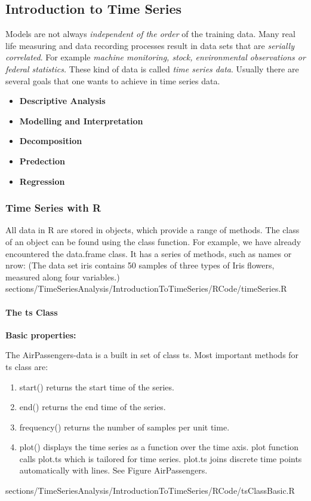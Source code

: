 \subsection{Introduction to Time Series}
	Models are not always \textit{independent of the order} of the training data. Many real life measuring and data recording processes result in data sets that are \textit{serially correlated}. For example \textit{machine monitoring, stock, environmental observations or federal statistics.} These kind of data is called \textit{time series data}. Usually there are several goals that one wants to achieve in time series data.
	\begin{itemize}
		\item \textbf{Descriptive Analysis}
		\item \textbf{Modelling and Interpretation}
		\item \textbf{Decomposition}
		\item \textbf{Predection}
		\item \textbf{Regression}
	\end{itemize}
	\subsubsection{Time Series with \color{blue}R}
		\RTheory
		{	
			All data in {\color{blue}R} are stored in objects, which provide a range of methods. The class of an object can be found using the {\color{blue}class} function. For example, we have already encountered the {\color{blue}data.frame} class. It has a series of methods, such as {\color{blue}names} or {\color{blue}nrow}: \vfill (The data set iris contains 50 samples of three types of Iris flowers, measured along four variables.)
		}
		{
			sections/TimeSeriesAnalysis/IntroductionToTimeSeries/RCode/timeSeries.R
		}	
	
		\paragraph{The {\color{blue}ts} Class}
			\RTheory
			{
				\textbf{Basic properties:}
				
				\vfill
				
				The AirPassengers-data is a built in set of class {\color{blue}ts}. Most important methods for {\color{blue}ts} class are:
				
				\vfill 
				\begin{enumerate}
					\item  {\color{blue}start()} returns the start time of the series.
					\item  {\color{blue}end()} returns the end time of the series.
					\item  {\color{blue}frequency()} returns the number of samples per unit time.
					\item  {\color{blue}plot()} displays the time series as a function over the time axis. {\color{blue}plot} function calls {\color{blue}plot.ts} which is tailored for time series. {\color{blue}plot.ts} joins discrete time points automatically with lines.  See Figure AirPassengers. 
				\end{enumerate}}
			{
				sections/TimeSeriesAnalysis/IntroductionToTimeSeries/RCode/tsClassBasic.R
			}
		
